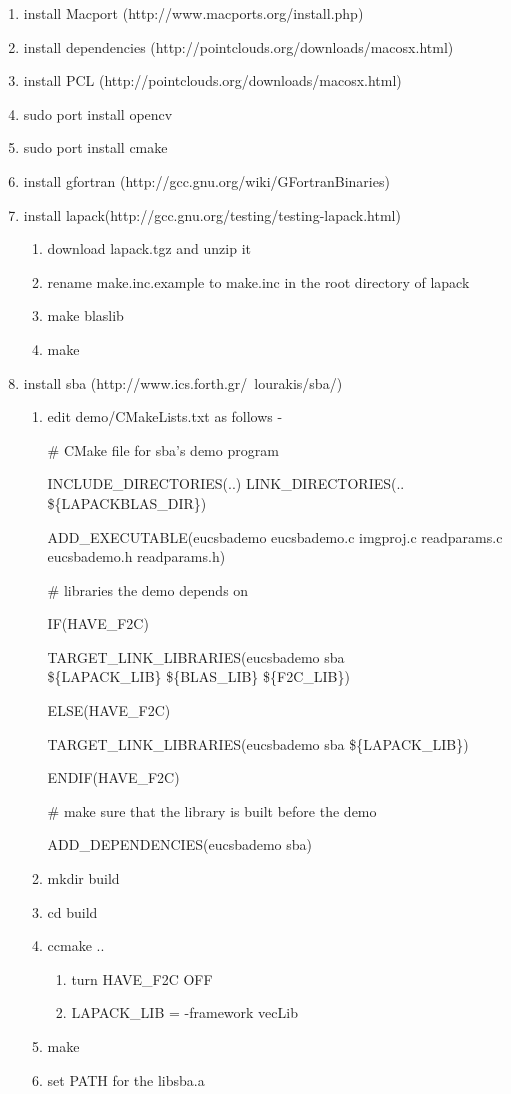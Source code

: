 \documentclass[12pt]{article}
\begin{document}
\begin{enumerate}
	\item{} install Macport (http://www.macports.org/install.php) 
	\item{} install dependencies (http://pointclouds.org/downloads/macosx.html)
	\item{} install PCL (http://pointclouds.org/downloads/macosx.html)
	\item{} sudo port install opencv
	\item{} sudo port install cmake
	\item{} install gfortran (http://gcc.gnu.org/wiki/GFortranBinaries)
	\item{} install lapack(http://gcc.gnu.org/testing/testing-lapack.html)
	\begin{enumerate}
		\item{} download lapack.tgz and unzip it
		\item{} rename make.inc.example to make.inc in the root directory of lapack 
		\item{} make blaslib
		\item{} make
	\end{enumerate}
	\item{} install sba (http://www.ics.forth.gr/~lourakis/sba/) 
	\begin{enumerate}
		\item{edit demo/CMakeLists.txt as follows} -
		
			\# CMake file for sba's demo program

			INCLUDE\_DIRECTORIES(..)
			LINK\_DIRECTORIES(.. \$\{LAPACKBLAS\_DIR\})

			ADD\_EXECUTABLE(eucsbademo eucsbademo.c imgproj.c readparams.c eucsbademo.h readparams.h)
			
			\# libraries the demo depends on
			
			IF(HAVE\_F2C)
			
				TARGET\_LINK\_LIBRARIES(eucsbademo sba \\\$\{LAPACK\_LIB\} \$\{BLAS\_LIB\} \$\{F2C\_LIB\})
				
			ELSE(HAVE\_F2C)
			
				TARGET\_LINK\_LIBRARIES(eucsbademo sba \$\{LAPACK\_LIB\})
				
			ENDIF(HAVE\_F2C)

			\# make sure that the library is built before the demo

			ADD\_DEPENDENCIES(eucsbademo sba)

		\item{mkdir build}
		\item{cd build}
		\item{ccmake ..}
		\begin{enumerate}
			\item{turn HAVE\_F2C OFF}
			\item{LAPACK\_LIB = -framework vecLib}
		\end{enumerate}
		\item{make}
		\item{set PATH for the libsba.a}
	\end{enumerate}
\end{enumerate}
\end{document}
